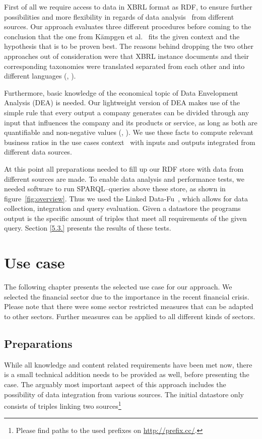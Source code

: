 \documentclass[runningheads]{llncs}
\begin{document}
First of all we require access to data in XBRL format as RDF, to ensure further possibilities and more flexibility in regards of data analysis~\cite{Mill98} from different sources.
Our approach evaluates three different procedures before coming to the conclusion that the one from K\"ampgen et al.~\cite{KWOW14} fits the given context and the hypothesis that is to be proven best.
The reasons behind dropping the two other approaches out of consideration were that XBRL instance documents and their corresponding taxonomies were translated separated from each other and into different languages (\cite{GaGi10}, \cite{BRLD10}).

Furthermore, basic knowledge of the economical topic of Data Envelopment Analysis (DEA) is needed.
Our lightweight version of DEA makes use of the simple rule that every output a company generates can be divided through any input that influences the company and its products or service, as long as both are quantifiable and non-negative values (\cite{Schu14}, \cite{Wei01}).
We use these facts to compute relevant business ratios in the use cases context~\cite{CeCP08} with inputs and outputs integrated from different data sources.

At this point all preparations needed to fill up our RDF store with data from different sources are made.
To enable data analysis and performance tests, we needed software to run SPARQL--queries above these store, as shown in figure~\ref{fig:overview}.
Thus we used the Linked Data-Fu~\cite{SSHS13}, which allows for data collection, integration and query evaluation. %
Given a datastore the programs output is the specific amount of triples that meet all requirements of the given query.
Section \ref{5.3.} presents the results of these tests.

\section{Use case}\label{c3}

The following chapter presents the selected use case for our approach.
We selected the financial sector due to the importance in the recent financial crisis. %
Please note that there were some sector restricted measures that can be adapted to other sectors.
Further measures can be applied to all different kinds of sectors.

\subsection{Preparations}
While all knowledge and content related requirements have been met now, there is a small technical addition needs to be provided as well, before presenting the case. The arguably most important aspect of this approach includes the possibility of data integration from various sources. The initial datastore only consists of triples linking two sources\footnote{Please find paths to the used prefixes on \url{http://prefix.cc/}.}
\end{document}
